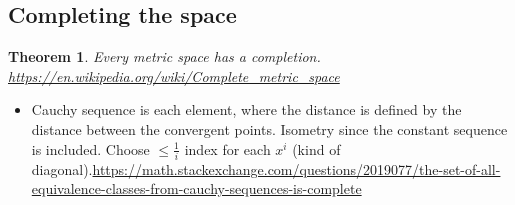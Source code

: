 \documentclass{article}
\newtheorem{theorem}{Theorem}
\theoremstyle{remark}
\begin{document}
\subsection*{Completing the space}
\begin{theorem}
    Every metric space has a completion.
    \url{https://en.wikipedia.org/wiki/Complete_metric_space}
\end{theorem}
\begin{itemize}
    \item Cauchy sequence is each element, where the distance is defined by the distance between the convergent points. Isometry since the constant sequence is included. Choose $\leq\frac 1i$ index for each $x^i$ (kind of diagonal).\url{https://math.stackexchange.com/questions/2019077/the-set-of-all-equivalence-classes-from-cauchy-sequences-is-complete}
\end{itemize}
\end{document}
